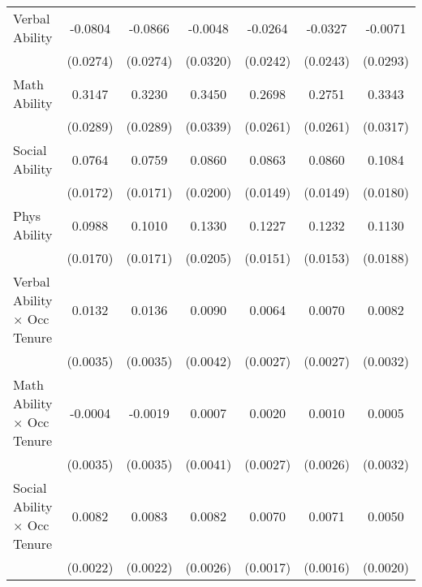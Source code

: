 {\begin{longtable}{l*{6}{c}}
Verbal Ability      &     -0.0804\sym{***}&     -0.0866\sym{***}&     -0.0048         &     -0.0264         &     -0.0327         &     -0.0071         \\
                    &    (0.0274)         &    (0.0274)         &    (0.0320)         &    (0.0242)         &    (0.0243)         &    (0.0293)         \\
Math Ability        &      0.3147\sym{***}&      0.3230\sym{***}&      0.3450\sym{***}&      0.2698\sym{***}&      0.2751\sym{***}&      0.3343\sym{***}\\
                    &    (0.0289)         &    (0.0289)         &    (0.0339)         &    (0.0261)         &    (0.0261)         &    (0.0317)         \\
Social Ability      &      0.0764\sym{***}&      0.0759\sym{***}&      0.0860\sym{***}&      0.0863\sym{***}&      0.0860\sym{***}&      0.1084\sym{***}\\
                    &    (0.0172)         &    (0.0171)         &    (0.0200)         &    (0.0149)         &    (0.0149)         &    (0.0180)         \\
Phys Ability        &      0.0988\sym{***}&      0.1010\sym{***}&      0.1330\sym{***}&      0.1227\sym{***}&      0.1232\sym{***}&      0.1130\sym{***}\\
                    &    (0.0170)         &    (0.0171)         &    (0.0205)         &    (0.0151)         &    (0.0153)         &    (0.0188)         \\
Verbal Ability $\times$ Occ Tenure&      0.0132\sym{***}&      0.0136\sym{***}&      0.0090\sym{**} &      0.0064\sym{**} &      0.0070\sym{***}&      0.0082\sym{**} \\
                    &    (0.0035)         &    (0.0035)         &    (0.0042)         &    (0.0027)         &    (0.0027)         &    (0.0032)         \\
Math Ability $\times$ Occ Tenure&     -0.0004         &     -0.0019         &      0.0007         &      0.0020         &      0.0010         &      0.0005         \\
                    &    (0.0035)         &    (0.0035)         &    (0.0041)         &    (0.0027)         &    (0.0026)         &    (0.0032)         \\
Social Ability $\times$ Occ Tenure&      0.0082\sym{***}&      0.0083\sym{***}&      0.0082\sym{***}&      0.0070\sym{***}&      0.0071\sym{***}&      0.0050\sym{**} \\
                    &    (0.0022)         &    (0.0022)         &    (0.0026)         &    (0.0017)         &    (0.0016)         &    (0.0020)         \\

\end{longtable}}
